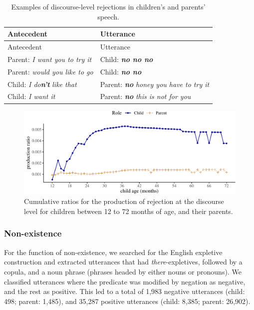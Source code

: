 \documentclass[
  english,
  man,floatsintext]{apa6}
\begin{document}
\begin{longtable}[]{@{}ll@{}}
\caption{\label{tab:disreject} Examples of discourse-level rejections in children's and parents' speech.}\tabularnewline
\toprule
Antecedent & Utterance \\
\midrule
\endfirsthead
\toprule
Antecedent & Utterance \\
\midrule
\endhead
Parent: \emph{I want you to try it} & Child: \textbf{\emph{no no no}} \\
Parent: \emph{would you like to go} & Child: \textbf{\emph{no no}} \\
Child: \emph{I do}\textbf{\emph{n't}} \emph{like that} & Parent: \textbf{\emph{no}} \emph{honey you have to try it} \\
Child: \emph{I want it} & Parent: \textbf{\emph{no}} \emph{this is not for you} \\
\bottomrule
\end{longtable}

\begin{figure}[H]

{\centering \includegraphics{neg_construction_article_files/figure-latex/emotiondiscourse-1} 

}

\caption{Cumulative ratios for the production of rejection at the discourse level for children between 12 to 72 months of age, and their parents.}\label{fig:emotiondiscourse}
\end{figure}

\hypertarget{non-existence}{%
\subsubsection{Non-existence}\label{non-existence}}

For the function of non-existence, we searched for the English expletive construction and extracted utterances that had \emph{there}-expletives, followed by a copula, and a noun phrase (phrases headed by either nouns or pronouns). We classified utterances where the predicate was modified by negation as negative, and the rest as positive. This led to a total of 1,983 negative utterances (child: 498; parent: 1,485), and 35,287 positive utterances (child: 8,385; parent: 26,902).
\end{document}
